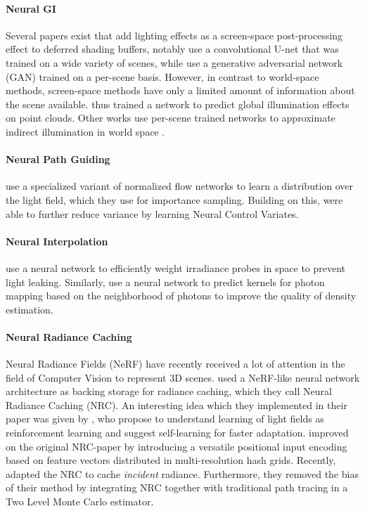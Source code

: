 \paragraph{Neural GI}
Several papers exist that add lighting effects as a screen-space post-processing effect to deferred shading buffers, notably \textcite{nalbach2017} use a convolutional U-net that was trained on a wide variety of scenes, while \textcite{thomas2018} use a generative adversarial network (GAN) trained on a per-scene basis.
However, in contrast to world-space methods, screen-space methods have only a limited amount of information about the scene available.
\textcite{hermosilla2019} thus trained a network to predict global illumination effects on point clouds.
Other works use per-scene trained networks to approximate indirect illumination in world space .

\paragraph{Neural Path Guiding}
\textcite{muller2019} use a specialized variant of normalized flow networks to learn a distribution over the light field, which they use for importance sampling.
Building on this, \textcite{muller2020} were able to further reduce variance by learning Neural Control Variates.

\paragraph{Neural Interpolation}
\textcite{iwanicki2017} use a neural network to efficiently weight irradiance probes in space to prevent light leaking.
Similarly, \textcite{zhu2020} use a neural network to predict kernels for photon mapping based on the neighborhood of photons to improve the quality of density estimation.

\paragraph{Neural Radiance Caching}
Neural Radiance Fields (NeRF)  have recently received a lot of attention in the field of Computer Vision to represent 3D scenes.
\textcite{muller2021} used a NeRF-like neural network architecture as backing storage for radiance caching, which they call Neural Radiance Caching (NRC).
An interesting idea which they implemented in their paper was given by \textcite{dahm2017}, who propose to understand learning of light fields as reinforcement learning and suggest self-learning for faster adaptation.
\textcite{muller2022} improved on the original NRC-paper by introducing a versatile positional input encoding based on feature vectors distributed in multi-resolution hash grids.
Recently, \textcite{dereviannykh2024} adapted the NRC to cache \emph{incident} radiance.
Furthermore, they removed the bias of their method by integrating NRC together with traditional path tracing in a Two Level Monte Carlo estimator.

